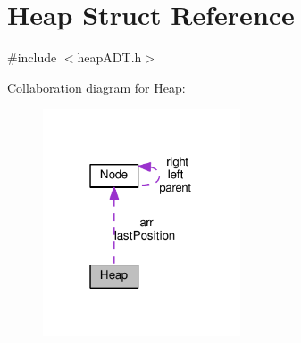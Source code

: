 \hypertarget{structHeap}{}\section{Heap Struct Reference}
\label{structHeap}


{\ttfamily \#include $<$heap\+A\+D\+T.\+h$>$}



Collaboration diagram for Heap\+:
\nopagebreak
\begin{figure}[H]
\begin{center}
\leavevmode
\includegraphics[width=166pt]{structHeap__coll__graph}
\end{center}
\end{figure}

